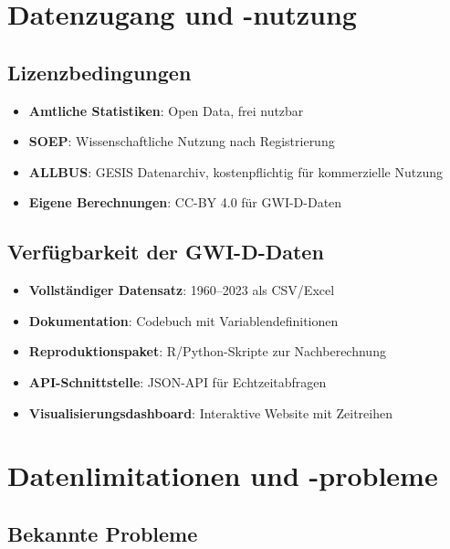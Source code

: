 \section{Datenzugang und -nutzung}

\subsection{Lizenzbedingungen}

\begin{itemize}
\item \textbf{Amtliche Statistiken}: Open Data, frei nutzbar
\item \textbf{SOEP}: Wissenschaftliche Nutzung nach Registrierung
\item \textbf{ALLBUS}: GESIS Datenarchiv, kostenpflichtig für kommerzielle Nutzung
\item \textbf{Eigene Berechnungen}: CC-BY 4.0 für GWI-D-Daten
\end{itemize}

\subsection{Verfügbarkeit der GWI-D-Daten}

\begin{itemize}
\item \textbf{Vollständiger Datensatz}: 1960--2023 als CSV/Excel
\item \textbf{Dokumentation}: Codebuch mit Variablendefinitionen
\item \textbf{Reproduktionspaket}: R/Python-Skripte zur Nachberechnung
\item \textbf{API-Schnittstelle}: JSON-API für Echtzeitabfragen
\item \textbf{Visualisierungsdashboard}: Interaktive Website mit Zeitreihen
\end{itemize}

\section{Datenlimitationen und -probleme}

\subsection{Bekannte Probleme}

